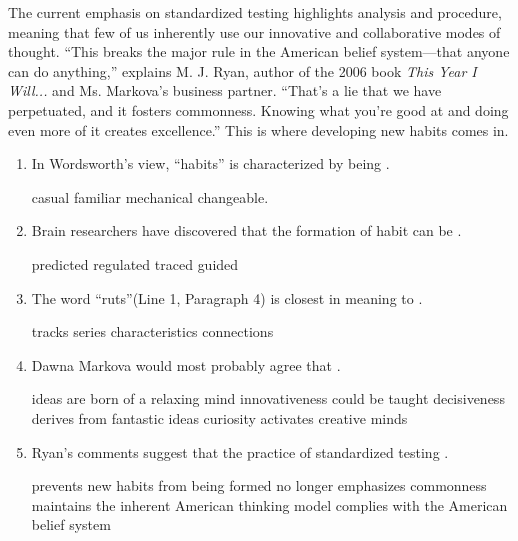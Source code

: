 The current emphasis on standardized testing highlights analysis and
procedure, meaning that few of us inherently use our innovative and
collaborative modes of thought. ``This breaks the major rule in the
American belief system---that anyone can do anything,'' explains M. J.
Ryan, author of the 2006 book \emph{This Year I Will...} and Ms.
Markova's business partner. ``That's a lie that we have perpetuated, and
it fosters commonness. Knowing what you're good at and doing even more
of it creates excellence.'' This is where developing new habits comes
in.


\begin{enumerate}[resume]
	\item
 In Wordsworth's view, ``habits'' is characterized by being \lineread.



\fourchoices
{casual}
{familiar}
{mechanical}
{changeable.}




\item
Brain researchers have discovered that the formation of
habit can be \lineread.



\fourchoices
{predicted}
{regulated}
{traced}
{guided}




\item
The word ``ruts''(Line 1, Paragraph 4) is closest in meaning to \lineread.


\fourchoices
{tracks}
{series}
{characteristics}
{connections}



\item
 Dawna Markova would most probably agree that \lineread.


\fourchoices
{ideas are born of a relaxing mind}
{innovativeness could be taught}
{decisiveness derives from fantastic ideas}
{curiosity activates creative minds}



\item
 Ryan's comments suggest that the practice of standardized
testing \lineread.


\fourchoices
{prevents new habits from being formed}
{no longer emphasizes commonness}
{maintains the inherent American thinking model}
{complies with the American belief system}


\end{enumerate}



